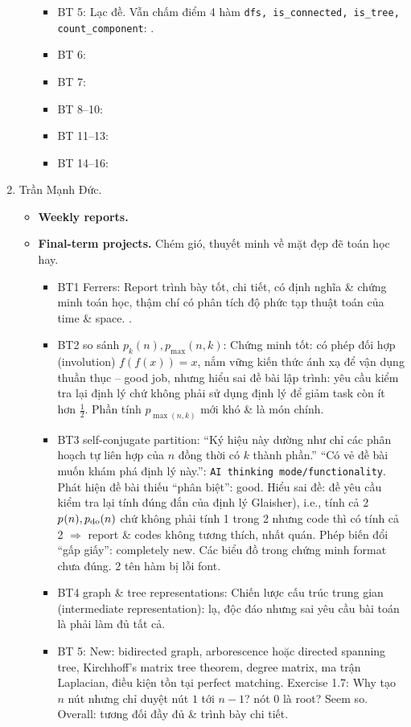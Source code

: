 \documentclass{article}
\begin{document}
\begin{enumerate}
\begin{itemize}
\begin{itemize}
            \item BT 5: Lạc đề. Vẫn chấm điểm 4 hàm \verb|dfs, is_connected, is_tree, count_component|: .
            \item BT 6:
            \item BT 7:
            \item BT 8--10:
            \item BT 11--13:
            \item BT 14--16:
        \end{itemize}
    \end{itemize}
    \item {\sc Trần Mạnh Đức.}
    \begin{itemize}
        \item {\bf Weekly reports.}
        \item {\bf Final-term projects.} Chém gió, thuyết minh về mặt đẹp đẽ toán học hay.
        \begin{itemize}
            \item BT1 Ferrers: Report trình bày tốt, chi tiết, có định nghĩa \& chứng minh toán học, thậm chí có phân tích độ phức tạp thuật toán của time \& space. .
            \item BT2 so sánh $p_k(n),p_{\max}(n,k)$: Chứng minh tốt: có phép đối hợp (involution) $f(f(x)) = x$, nắm vững kiến thức ánh xạ để vận dụng thuần thục -- good job, nhưng hiểu sai đề bài lập trình: yêu cầu kiểm tra lại định lý chứ không phải sử dụng định lý để giảm task còn ít hơn $\frac{1}{2}$. Phần tính $p_{\max(n,k)}$ mới khó \& là món chính.
            \item BT3 self-conjugate partition: ``Ký hiệu này dường như chỉ các phân hoạch tự liên hợp của $n$ đồng thời có $k$ thành phần.'' ``Có vẻ đề bài muốn khám phá định lý này.'': {\tt AI thinking mode/functionality}. Phát hiện đề bài thiếu ``phân biệt'': good. Hiểu sai đề: đề yêu cầu kiểm tra lại tính đúng đắn của định lý Glaisher), i.e., tính cả 2 $p_{\sc }(n),p_{\rm do}(n)$ chứ không phải tính 1 trong 2 nhưng code thì có tính cả 2 $\Rightarrow$ report \& codes không tương thích, nhất quán. Phép biến đổi ``gấp giấy'': completely new. Các biểu đồ trong chứng minh format chưa đúng. 2 tên hàm bị lỗi font.
            \item BT4 graph \& tree representations: Chiến lược cấu trúc trung gian (intermediate representation): lạ, độc đáo nhưng sai yêu cầu bài toán là phải làm đủ tất cả.
            \item BT 5: New: bidirected graph, arborescence hoặc directed spanning tree, Kirchhoff's matrix tree theorem, degree matrix, ma trận Laplacian, điều kiện tồn tại perfect matching. Exercise 1.7: Why tạo $n$ nút nhưng chỉ duyệt nút $1$ tới $n - 1$? nót $0$ là root? Seem so. Overall: tương đối đầy đủ \& trình bày chi tiết.

\end{itemize}
\end{itemize}
\end{enumerate}
\end{document}
